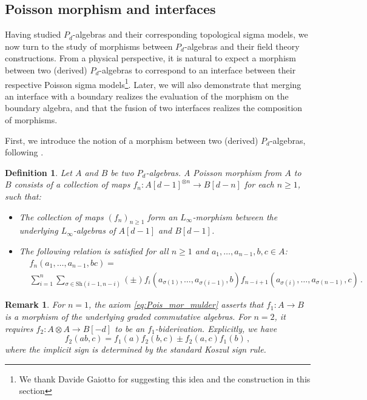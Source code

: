 \documentclass[11pt]{article}
\numberwithin{equation}{section}
\newtheorem{definition}{Definition}[section]
\newtheorem{remark}{Remark}[section]
\begin{document}
\subsection{Poisson morphism and interfaces}
\label{sec:inter_from_pois_mor}
Having studied $P_d$-algebras and their corresponding topological sigma models, we now turn to the study of morphisms between $P_d$-algebras and their field theory constructions. From a physical perspective, it is natural to expect a morphism between two (derived) $P_d$-algebras to correspond to an interface between their respective Poisson sigma models\footnote{We thank Davide Gaiotto for suggesting this idea and the construction in this section}. Later, we will also demonstrate that merging an interface with a boundary realizes the evaluation of the morphism on the boundary algebra, and that the fusion of two interfaces realizes the composition of morphisms.


First, we introduce the notion of a morphism between two (derived) $P_d$-algebras, following \cite{bandiera2020shifted}.
\begin{definition}
Let $A$ and $B$ be two $P_d$-algebras. A Poisson morphism from $A$ to $B$ consists of a collection of maps $f_n: A[d-1]^{\otimes n} \to B[d-n]$ for each $n\geq 1$, such that:
\begin{itemize}
    \item The collection of maps $(f_n)_{n\geq 1}$ form an $L_\infty$-morphism between the underlying $L_\infty$-algebras of $A[d-1]$ and $B[d-1]$.
    \item The following relation is satisfied for all $n \geq 1$ and $a_1, \dots, a_{n-1}, b,c \in A$:
    \begin{equation}\label{eq:Pois_mor_mulder}
		\begin{aligned}
			&f_n(a_1,\dots,a_{n-1},bc) = \\
			&\sum_{i=1}^{n}\sum_{\sigma \in \mathrm{Sh}(i-1,n-i)}(\pm) f_i(a_{\sigma(1)},\dots,a_{\sigma(i-1)},b)f_{n-i+1}(a_{\sigma(i)},\dots,a_{\sigma(n-1)},c)\,.
		\end{aligned}
	\end{equation}
\end{itemize}
\end{definition}
\begin{remark}
	For $n = 1$, the axiom \eqref{eq:Pois_mor_mulder} asserts that $f_1 \colon A \to B$ is a morphism of the underlying graded commutative algebras. For $n = 2$, it requires $f_2 \colon A\otimes A \to B[-d]$ to be an $f_1$-biderivation. Explicitly, we have
	\begin{equation}\label{eq:mor_bider}
		f_2(ab, c) = f_1(a)f_2(b, c) \pm f_2(a, c)f_1(b)\,,
	\end{equation}
	where the implicit sign is determined by the standard Koszul sign rule.
\end{remark}
\end{document}
